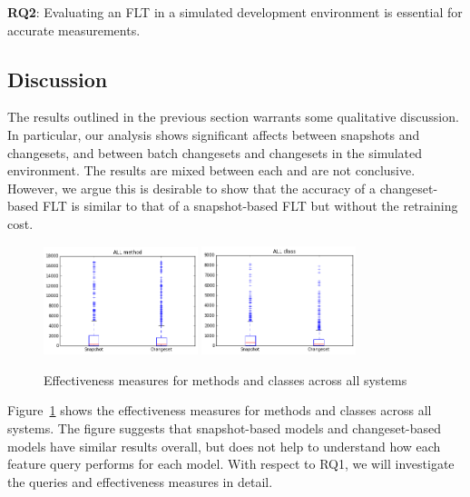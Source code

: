 \begin{framed}
    \textbf{RQ2}:
    Evaluating an FLT in a simulated development environment is essential for
    accurate measurements.
\end{framed}



\subsection{Discussion}

The results outlined in the previous section warrants some qualitative
discussion.  In particular, our analysis shows significant affects between
snapshots and changesets, and between batch changesets and changesets in the simulated environment.
The results are mixed between each and are not conclusive.  However, we argue
this is desirable to show that the accuracy of a changeset-based FLT is similar
to that of a snapshot-based FLT but without the retraining cost.

\begin{figure}[t]
\centering
\includegraphics[width=0.4\textwidth]{figures/all_method}
\includegraphics[width=0.4\textwidth]{figures/all_class}
\caption{Effectiveness measures for methods and classes across all systems}
\label{fig:em}
\end{figure}

Figure~\ref{fig:em} shows the effectiveness measures for methods and classes
across all systems. The figure suggests that snapshot-based models and
changeset-based models have similar results overall, but does not help to
understand how each feature query performs for each model.
With respect to RQ1, we will investigate the queries and effectiveness measures in detail.

